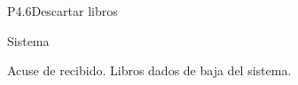 \begin{Proceso}{P4.6}{Descartar libros }
{\begin{UClist}
    \end {UClist}
  }
  
   { %
    Sistema
  }

   { %
    \begin{UClist}
    
      \UCli Acuse de recibido.
      \UCli Libros dados de baja del sistema.
  
    \end{UClist}
  }

   { %
  }

   { %
  
  }
   { %
  }


\end{Proceso}

